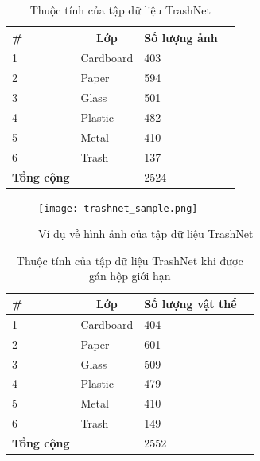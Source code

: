 \documentclass[../the.tex]{subfiles}
\begin{document}
\begin{table}[!ht]
	\centering
	\caption{Thuộc tính của tập dữ liệu TrashNet}
	\begin{tabular}{|p{2cm}|p{4cm}|p{3.5cm}|p{2cm}|}
		\hline
		\multicolumn{1}{|l|}{
		\textbf{\#}} 
		& \multicolumn{1}{c|}{\textbf{Lớp}} 
		& \multicolumn{1}{c|}{\textbf{Số lượng ảnh}} \\
		\hline
	
		 1
		& Cardboard 
		& 403\\
		\hline
		
		 2
		& Paper
		& 594\\
		\hline
		
		 3
		& Glass
		& 501\\
        \hline
        
		 4
		& Plastic
		& 482 \\
        \hline
        
		 5
		& Metal
		& 410\\
        \hline
        
		 6
		& Trash
		& 137 \\
        \hline
  
        
		 \textbf{Tổng cộng}
		& 
		& 2524 \\
		\hline
	\end{tabular}
	
	\label{tab:dataset}
\end{table}


\begin{figure}[H]
\centering
	\texttt{[image: trashnet\_sample.png]}
	\caption{Ví dụ về hình ảnh của tập dữ liệu TrashNet}
	\label{fig:dataset_0}
\end{figure}

\begin{table}[!ht]
	\centering
	\caption{Thuộc tính của tập dữ liệu TrashNet khi được gán hộp giới hạn}
	\begin{tabular}{|p{2cm}|p{4cm}|p{3.5cm}|p{2cm}|}
		\hline
		\multicolumn{1}{|l|}{
		\textbf{\#}} 
		& \multicolumn{1}{c|}{\textbf{Lớp}} 
		& \multicolumn{1}{c|}{\textbf{Số lượng vật thể}} \\
		\hline
	
		 1
		& Cardboard 
		& 404\\
		\hline
		
		 2
		& Paper
		& 601\\
		\hline
		
		 3
		& Glass
		& 509\\
        \hline
        
		 4
		& Plastic
		& 479 \\
        \hline
        
		 5
		& Metal
		& 410\\
        \hline
        
		 6
		& Trash
		& 149 \\
        \hline
  
        
		 \textbf{Tổng cộng}
		& 
		& 2552 \\
		\hline
	\end{tabular}
	
	\label{tab:dataset1}
\end{table}
\end{document}
